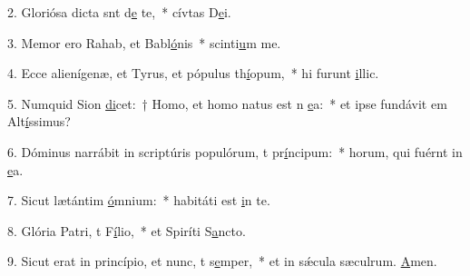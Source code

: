 2. Gloriósa dicta snt d\uline{e} te,~* cívtas D\uline{e}i.\par 
3. Memor ero Rahab, et Babl\uline{ó}nis~* scinti\uline{u}m me.\par 
4. Ecce alienígenæ, et Tyrus, et pópulus th\uline{í}opum,~* hi furunt \uline{i}llic.\par 
5. Numquid Sion \uline{di}cet:~† Homo, et homo natus est n \uline{e}a:~* et ipse fundávit em Alt\uline{í}ssimus?\par 
6. Dóminus narrábit in scriptúris populórum, t pr\uline{í}ncipum:~* horum, qui fuérnt in \uline{e}a.\par 
7. Sicut lætántim \uline{ó}mnium:~* habitáti est \uline{i}n te.\par 
8. Glória Patri, t F\uline{í}lio,~* et Spiríti S\uline{a}ncto.\par 
9. Sicut erat in princípio, et nunc, t s\uline{e}mper,~* et in sǽcula sæculrum. \uline{A}men.\par 
